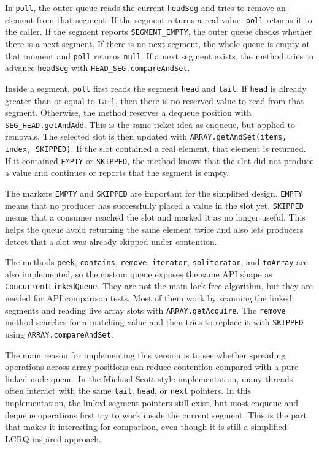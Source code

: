 In \texttt{poll}, the outer queue reads the current \texttt{headSeg} and tries to remove an element from that segment. If the segment returns a real value, \texttt{poll} returns it to the caller. If the segment reports \texttt{SEGMENT\_EMPTY}, the outer queue checks whether there is a next segment. If there is no next segment, the whole queue is empty at that moment and \texttt{poll} returns \texttt{null}. If a next segment exists, the method tries to advance \texttt{headSeg} with \texttt{HEAD\_SEG.compareAndSet}.


Inside a segment, \texttt{poll} first reads the segment \texttt{head} and \texttt{tail}. If \texttt{head} is already greater than or equal to \texttt{tail}, then there is no reserved value to read from that segment. Otherwise, the method reserves a dequeue position with \texttt{SEG\_HEAD.getAndAdd}. This is the same ticket idea as enqueue, but applied to removals. The selected slot is then updated with \texttt{ARRAY.getAndSet(items, index, SKIPPED)}. If the slot contained a real element, that element is returned. If it contained \texttt{EMPTY} or \texttt{SKIPPED}, the method knows that the slot did not produce a value and continues or reports that the segment is empty.

The markers \texttt{EMPTY} and \texttt{SKIPPED} are important for the simplified design. \texttt{EMPTY} means that no producer has successfully placed a value in the slot yet. \texttt{SKIPPED} means that a consumer reached the slot and marked it as no longer useful. This helps the queue avoid returning the same element twice and also lets producers detect that a slot was already skipped under contention.

The methods \texttt{peek}, \texttt{contains}, \texttt{remove}, \texttt{iterator}, \texttt{spliterator}, and \texttt{toArray} are also implemented, so the custom queue exposes the same API shape as \texttt{ConcurrentLinkedQueue}. They are not the main lock-free algorithm, but they are needed for API comparison tests. Most of them work by scanning the linked segments and reading live array slots with \texttt{ARRAY.getAcquire}. The \texttt{remove} method searches for a matching value and then tries to replace it with \texttt{SKIPPED} using \texttt{ARRAY.compareAndSet}.

The main reason for implementing this version is to see whether spreading operations across array positions can reduce contention compared with a pure linked-node queue. In the Michael-Scott-style implementation, many threads often interact with the same \texttt{tail}, \texttt{head}, or \texttt{next} pointers. In this implementation, the linked segment pointers still exist, but most enqueue and dequeue operations first try to work inside the current segment. This is the part that makes it interesting for comparison, even though it is still a simplified LCRQ-inspired approach.
